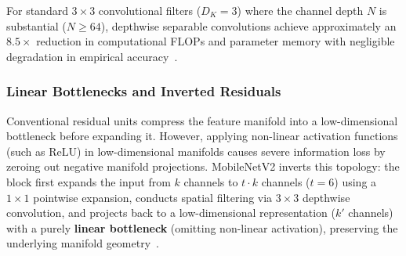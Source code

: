 \documentclass[11pt,a4paper]{article}
\begin{document}
For standard $3 \times 3$ convolutional filters ($D_K = 3$) where the channel depth $N$ is substantial ($N \ge 64$), depthwise separable convolutions achieve approximately an $\mathbf{8.5\times}$ reduction in computational FLOPs and parameter memory with negligible degradation in empirical accuracy~\cite{sandler2018mobilenetv2}.

\subsubsection{Linear Bottlenecks and Inverted Residuals}
Conventional residual units compress the feature manifold into a low-dimensional bottleneck before expanding it. However, applying non-linear activation functions (such as $\text{ReLU}$) in low-dimensional manifolds causes severe information loss by zeroing out negative manifold projections. MobileNetV2 inverts this topology: the block first expands the input from $k$ channels to $t \cdot k$ channels ($t=6$) using a $1 \times 1$ pointwise expansion, conducts spatial filtering via $3 \times 3$ depthwise convolution, and projects back to a low-dimensional representation ($k'$ channels) with a purely \textbf{linear bottleneck} (omitting non-linear activation), preserving the underlying manifold geometry~\cite{sandler2018mobilenetv2}.
\end{document}
